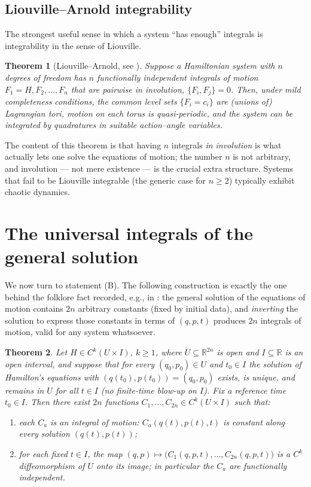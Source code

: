 \documentclass[11pt]{article}
\newtheorem{theorem}{Theorem}
\theoremstyle{definition}
\theoremstyle{remark}
\newcommand{\PB}[2]{\{#1,#2\}}
\begin{document}
\subsection{Liouville--Arnold integrability}

The strongest useful sense in which a system ``has enough'' integrals is
integrability in the sense of Liouville.

\begin{theorem}[Liouville--Arnold, see \cite{arnold}]
Suppose a Hamiltonian system with $n$ degrees of freedom has $n$
functionally independent integrals of motion $F_1=H,F_2,\dots,F_n$ that are
pairwise in involution, $\PB{F_i}{F_j}=0$. Then, under mild completeness
conditions, the common level sets $\{F_i=c_i\}$ are (unions of) Lagrangian
tori, motion on each torus is quasi-periodic, and the system can be
integrated by quadratures in suitable action--angle variables.
\end{theorem}

The content of this theorem is that having $n$ integrals \emph{in
involution} is what actually lets one solve the equations of motion; the
number $n$ is not arbitrary, and involution --- not mere existence --- is
the crucial extra structure. Systems that fail to be Liouville integrable
(the generic case for $n\ge 2$) typically exhibit chaotic dynamics.

\section{The universal integrals of the general solution}\label{sec:universal}

We now turn to statement (B). The following construction is exactly the
one behind the folklore fact recorded, e.g., in \cite{landau}: the general
solution of the equations of motion contains $2n$ arbitrary constants
(fixed by initial data), and \emph{inverting} the solution to express those
constants in terms of $(q,p,t)$ produces $2n$ integrals of motion, valid
for any system whatsoever.

\begin{theorem}\label{thm:universal}
Let $H\in C^k(U\times I)$, $k\ge 1$, where $U\subseteq\mathbb R^{2n}$ is
open and $I\subseteq\mathbb R$ is an open interval, and suppose that for
every $(q_0,p_0)\in U$ and $t_0\in I$ the solution of Hamilton's equations
with $(q(t_0),p(t_0))=(q_0,p_0)$ exists, is unique, and remains in $U$ for
all $t\in I$ (no finite-time blow-up on $I$). Fix a reference time
$t_0\in I$. Then there exist $2n$ functions $C_1,\dots,C_{2n}\in
C^k(U\times I)$ such that:
\begin{enumerate}[label=(\roman*)]
\item each $C_a$ is an integral of motion: $C_a(q(t),p(t),t)$ is constant
along every solution $(q(t),p(t))$;
\item for each fixed $t\in I$, the map $(q,p)\mapsto\big(C_1(q,p,t),\dots,C_{2n}(q,p,t)\big)$
is a $C^k$ diffeomorphism of $U$ onto its image; in particular the $C_a$
are functionally independent.
\end{enumerate}
\end{theorem}
\end{document}
